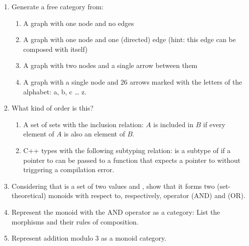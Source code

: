 \begin{enumerate}
  \tightlist
  \item
        Generate a free category from:

        \begin{enumerate}
          \tightlist
          \item
                A graph with one node and no edges
          \item
                A graph with one node and one (directed) edge (hint: this edge can
                be composed with itself)
          \item
                A graph with two nodes and a single arrow between them
          \item
                A graph with a single node and 26 arrows marked with the letters of
                the alphabet: a, b, c \ldots{} z.
        \end{enumerate}
  \item
        What kind of order is this?

        \begin{enumerate}
          \tightlist
          \item
                A set of sets with the inclusion relation: $A$ is included in $B$ if
                every element of $A$ is also an element of $B$.
          \item
                C++ types with the following subtyping relation:  is a subtype of
                 if a pointer to  can be passed to a function that expects a
                pointer to  without triggering a compilation error.
        \end{enumerate}
  \item
        Considering that  is a set of two values  and , show that
        it forms two (set-theoretical) monoids with respect to, respectively,
        operator \code{\&\&} (AND) and \code{||} (OR).
  \item
        Represent the  monoid with the AND operator as a category: List
        the morphisms and their rules of composition.
  \item
        Represent addition modulo 3 as a monoid category.
\end{enumerate}